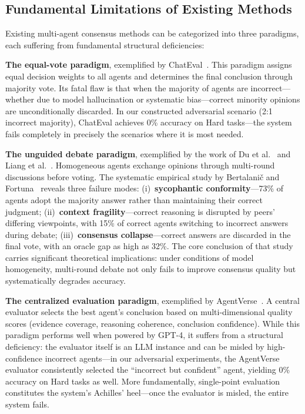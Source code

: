 \documentclass[12pt,a4paper]{article}
\begin{document}
\subsection{Fundamental Limitations of Existing Methods}\label{sec:limitation}

Existing multi-agent consensus methods can be categorized into three paradigms, each suffering from fundamental structural deficiencies:

\textbf{The equal-vote paradigm}, exemplified by ChatEval~\cite{chan2023chateval}. This paradigm assigns equal decision weights to all agents and determines the final conclusion through majority vote. Its fatal flaw is that when the majority of agents are incorrect---whether due to model hallucination or systematic bias---correct minority opinions are unconditionally discarded. In our constructed adversarial scenario (2:1 incorrect majority), ChatEval achieves 0\% accuracy on Hard tasks---the system fails completely in precisely the scenarios where it is most needed.

\textbf{The unguided debate paradigm}, exemplified by the work of Du et al.~\cite{du2023improving} and Liang et al.~\cite{liang2023encouraging}. Homogeneous agents exchange opinions through multi-round discussions before voting. The systematic empirical study by Bertalani\v{c} and Fortuna~\cite{bertalanic2026cost} reveals three failure modes: (i)~\textbf{sycophantic conformity}---73\% of agents adopt the majority answer rather than maintaining their correct judgment; (ii)~\textbf{context fragility}---correct reasoning is disrupted by peers' differing viewpoints, with 15\% of correct agents switching to incorrect answers during debate; (iii)~\textbf{consensus collapse}---correct answers are discarded in the final vote, with an oracle gap as high as 32\%. The core conclusion of that study carries significant theoretical implications: under conditions of model homogeneity, multi-round debate not only fails to improve consensus quality but systematically degrades accuracy.

\textbf{The centralized evaluation paradigm}, exemplified by AgentVerse~\cite{chen2023agentverse}. A central evaluator selects the best agent's conclusion based on multi-dimensional quality scores (evidence coverage, reasoning coherence, conclusion confidence). While this paradigm performs well when powered by GPT-4, it suffers from a structural deficiency: the evaluator itself is an LLM instance and can be misled by high-confidence incorrect agents---in our adversarial experiments, the AgentVerse evaluator consistently selected the ``incorrect but confident'' agent, yielding 0\% accuracy on Hard tasks as well. More fundamentally, single-point evaluation constitutes the system's Achilles' heel---once the evaluator is misled, the entire system fails.
\end{document}
